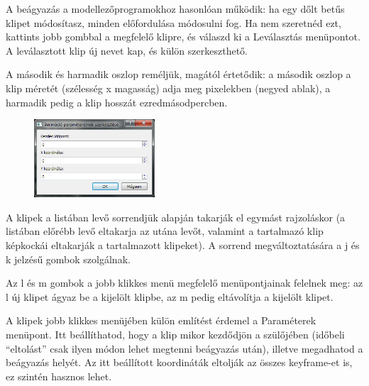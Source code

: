 \documentclass[a4paper,12pt,release]{article}
\begin{document}
A beágyazás a modellezőprogramokhoz hasonlóan működik: ha egy dőlt betűs klipet módosítasz, minden előfordulása módosulni fog. Ha nem szeretnéd ezt, kattints jobb gombbal a megfelelő klipre, és válaszd ki a Leválasztás menüpontot. A leválasztott klip új nevet kap, és külön szerkeszthető.

A második és harmadik oszlop reméljük, magától értetődik: a második oszlop a klip méretét (szélesség x magasság) adja meg pixelekben (negyed ablak), a harmadik pedig a klip hosszát ezredmásodpercben.

\begin{figure}
	\vspace{-27pt}
	\begin{center}
		\includegraphics[width=0.4\textwidth]{pics/childsettings.png}
	\end{center}
	\vspace{-27pt}
\end{figure}
A klipek a listában levő sorrendjük alapján takarják el egymást rajzoláskor (a listában előrébb levő eltakarja az utána levőt, valamint a tartalmazó klip képkockái eltakarják a tartalmazott klipeket). A sorrend megváltoztatására a j és k jelzésű gombok szolgálnak.

Az l és m gombok a jobb klikkes menü megfelelő menüpontjainak felelnek meg: az l új klipet ágyaz be a kijelölt klipbe, az m pedig eltávolítja a kijelölt klipet.

A klipek jobb klikkes menüjében külön említést érdemel a Paraméterek menüpont. Itt beállíthatod, hogy a klip mikor kezdődjön a szülőjében (időbeli ``eltolást'' csak ilyen módon lehet megtenni beágyazás után), illetve megadhatod a beágyazás helyét. Az itt beállított koordináták eltolják az összes keyframe-et is, ez szintén hasznos lehet.
\end{document}
